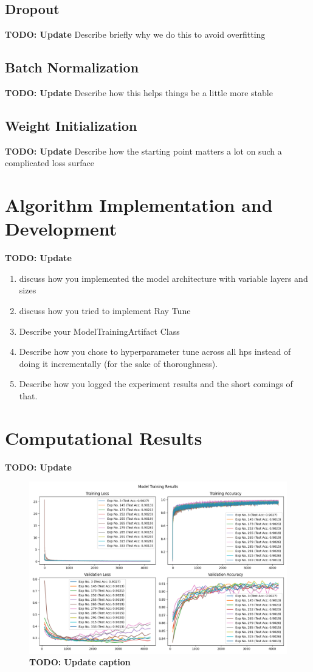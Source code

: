 \documentclass[11pt]{amsart}
\begin{document}
\subsection{Dropout}
\textbf{TODO: Update}
Describe briefly why we do this to avoid overfitting

\subsection{Batch Normalization}
\textbf{TODO: Update}
Describe how this helps things be a little more stable

\subsection{Weight Initialization}
\textbf{TODO: Update}
Describe how the starting point matters a lot on such a complicated loss surface

\section{Algorithm Implementation and Development}\label{sec:algorithms}
\textbf{TODO: Update}
\begin{enumerate}
\item discuss how you implemented the model architecture with variable layers and sizes
\item discuss how you tried to implement Ray Tune
\item Describe your ModelTrainingArtifact Class
\item Describe how you chose to hyperparameter tune across all hps instead of doing it incrementally (for the sake of thoroughness).
\item Describe how you logged the experiment results and the short comings of that.
\end{enumerate}

\section{Computational Results}\label{sec:results}

\textbf{TODO: Update}


\begin{figure}[h]
	\centering
	\includegraphics[width=.9\textwidth]{../visualizations/model_training_results_vis.png}
 	\caption{\textbf{TODO: Update caption}}\label{fig:f0}
\end{figure}
\end{document}
